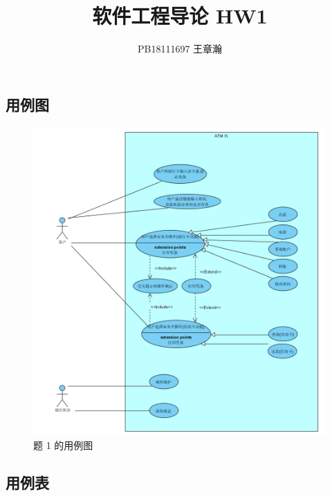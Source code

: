 \documentclass[UTF8]{article}
\title{软件工程导论 HW1}
\date{}
\author{PB18111697 王章瀚}
\begin{document}
\maketitle
\section{}
\subsection{用例图}
\begin{figure}[H]
	\centering
	\includegraphics[width=\linewidth]{1.png}
	\caption{题 1 的用例图}
\end{figure}\par
\subsection{用例表}
\end{document}
